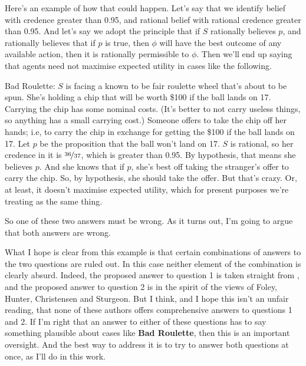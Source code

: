 Here's an example of how that could happen. Let's say that we identify belief with credence greater than 0.95, and rational belief with rational credence greater than 0.95. And let's say we adopt the principle that if \(S\) rationally believes \(p\), and rationally believes that if \(p\) is true, then \(\phi\) will have the best outcome of any available action, then it is rationally permissible to \(\phi\). Then we'll end up saying that agents need not maximise expected utility in cases like the following.

\begin{description*}
\item[Bad Roulette:] \(S\) is facing a known to be fair roulette wheel that's about to be spun. She's holding a chip that will be worth \$100 if the ball lands on 17. Carrying the chip has some nominal costs. (It's better to not carry useless things, so anything has a small carrying cost.) Someone offers to take the chip off her hands; i.e, to carry the chip in exchange for getting the \$100 if the ball lands on 17. Let \(p\) be the proposition that the ball won't land on 17. \(S\) is rational, so her credence in it is \(\nicefrac{36}{37}\), which is greater than 0.95. By hypothesis, that means she believes \(p\). And she knows that if \(p\), she's best off taking the stranger's offer to carry the chip. So, by hypothesis, she should take the offer. But that's crazy. Or, at least, it doesn't maximise expected utility, which for present purposes we're treating as the same thing.
\end{description*}

\noindent So one of these two answers must be wrong. As it turns out, I'm going to argue that both answers are wrong.

What I hope is clear from this example is that certain combinations of answers to the two questions are ruled out. In this case neither element of the combination is clearly absurd. Indeed, the proposed answer to question 1 is taken straight from \cite{FantlMcGrath2009}, and the proposed answer to question 2 is in the spirit of the views of Foley, Hunter, Christensen and Sturgeon. But I think, and I hope this isn't an unfair reading, that none of these authors offers comprehensive answers to questions 1 and 2. If I'm right that an answer to either of these questions has to say something plausible about cases like \textbf{Bad Roulette}, then this is an important oversight. And the best way to address it is to try to answer both questions at once, as I'll do in this work.


